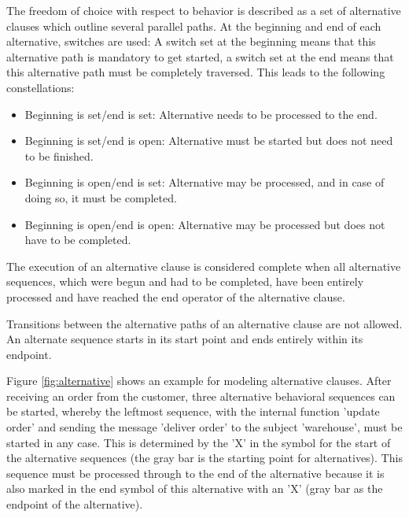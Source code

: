 The freedom of choice with respect to behavior is described as a set of alternative clauses which outline several parallel paths. At the beginning and end of each alternative, switches are used: A switch set at the beginning means that this alternative path is mandatory to get started, a switch set at the end means that this alternative path must be completely traversed. This leads to the following constellations:

\begin{itemize}
	\item Beginning is set/end is set: Alternative needs to be processed to the end.
	\item Beginning is set/end is open: Alternative must be started but does not need to be finished. 
	\item Beginning is open/end is set: Alternative may be processed, and in case of doing so, it must be completed.
	\item Beginning is open/end is open: Alternative may be processed but does not have to be completed.
\end{itemize}

The execution of an alternative clause is considered complete when all alternative sequences, which were begun and had to be completed, have been entirely processed and have reached the end operator of the alternative clause.

Transitions between the alternative paths of an alternative clause are not allowed. An alternate sequence starts in its start point and ends entirely within its endpoint.

Figure \ref{fig:alternative} shows an example for modeling alternative clauses. After receiving an order from the customer, three alternative behavioral sequences can be started, whereby the leftmost sequence, with the internal function 'update order' and sending the message 'deliver order' to the subject 'warehouse', must be started in any case. This is determined by the 'X' in the symbol for the start of the alternative sequences (the gray bar is the starting point for alternatives). This sequence must be processed through to the end of the alternative because it is also marked in the end symbol of this alternative with an 'X' (gray bar as the endpoint of the alternative).

